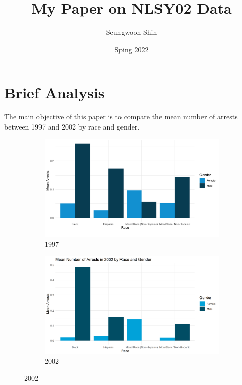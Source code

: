 \documentclass{article}
\author{Seungwoon Shin}
\title{My Paper on NLSY02 Data}
\date{Sping 2022}
\begin{document}
\maketitle

\section{Brief Analysis}
The main objective of this paper is to compare the mean number of arrests between 1997 and 2002 by race and gender. 

\begin{figure}[H]

    \caption{Mean Number of Arrests by Race and Gender}
    \centering
    \begin{subfigure}[b]{0.49\textwidth}
        \includegraphics[width=\textwidth]{arrests_by_racegender}
        \caption{1997}
    \end{subfigure}
    \begin{subfigure}[b]{0.49\textwidth}
        \includegraphics[width=\textwidth]{02arrests_by_racegender}
        \caption{2002}
    \end{subfigure}
    \label{fig:graph}


\end{figure}
\end{document}
